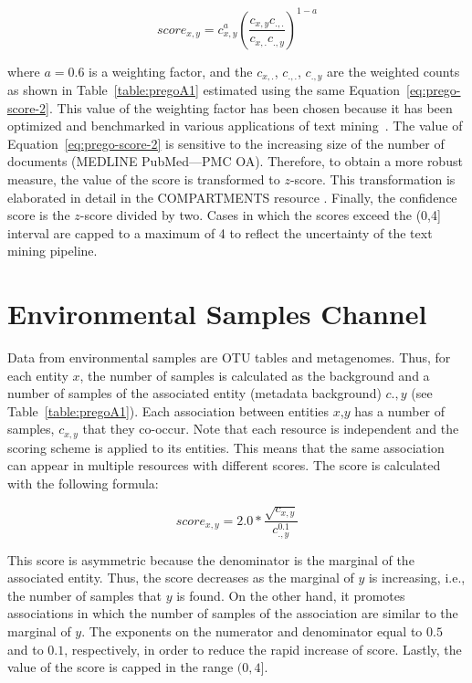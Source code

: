 \begin{equation}
   score_{x,y} = c_{x,y}^a (\frac{c_{x,y} c_{.,.}}{c_{x, .}c_{.,y}})^{1-a}
   \label{eq:prego-score-2}
\end{equation}
   


where $a = 0.6$ is a weighting factor, and the $c_{x,.}$, $c_{.,.}$, 
$c_{.,y}$ are the weighted counts as shown in Table~\ref{table:pregoA1} estimated using the same Equation~\ref{eq:prego-score-2}. 
This value of the weighting factor has been chosen because it has been optimized and benchmarked in various 
applications of text mining~\citep{franceschini2012string, binder2014compartments, pletscher2015diseases}. 
The value of Equation~\ref{eq:prego-score-2} is sensitive to the increasing size of the number of documents (MEDLINE PubMed—PMC OA).
Therefore, to obtain a more robust measure, the value of the score is transformed to $z$-score. 
This transformation is elaborated in detail in the COMPARTMENTS resource \citep{binder2014compartments}. 
Finally, the confidence score is the $z$-score divided by two. Cases in which the scores exceed the (0,4] interval are capped to a maximum of 4 to reflect the uncertainty of the text mining pipeline.

\section*{Environmental Samples Channel}

Data from environmental samples are OTU tables and metagenomes. 
Thus, for each entity $x$, the number of samples is calculated as the background 
and a number of samples of the associated entity (metadata background) $c.,y$ (see Table~\ref{table:pregoA1}). 
Each association between entities $x$,$y$ has a number of samples, $c_{x,y}$ that they co-occur. 
Note that each resource is independent and the scoring scheme is applied to its entities. 
This means that the same association can appear in multiple resources with different scores. 
The score is calculated with the following formula:

\begin{equation}
   score_{x,y} = 2.0*{\frac{\sqrt{c_{x,y}}}{c_{.,y}^{0.1}}}
\end{equation}


This score is asymmetric because the denominator is the marginal of the associated entity. 
Thus, the score decreases as the marginal of $y$ is increasing, i.e., the number of samples that $y$ is found. 
On the other hand, it promotes associations in which the number of samples of 
the association are similar to the marginal of $y$. 
The exponents on the numerator and denominator equal to $0.5$ and 
to $0.1$, respectively, in order to reduce the rapid increase of score.
Lastly, the value of the score is capped in the range $(0,4]$.


